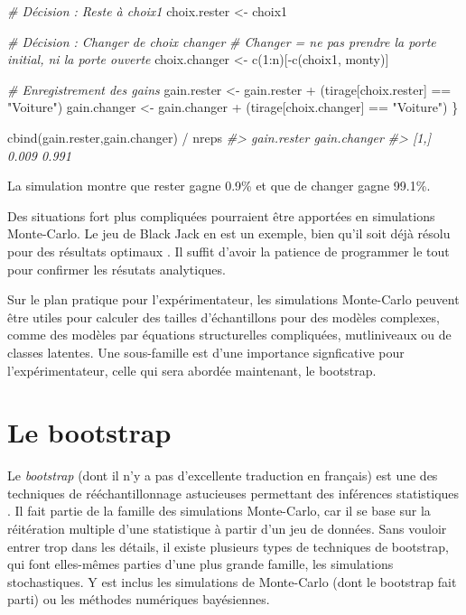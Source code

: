 \documentclass[
]{book}
\newenvironment{Shaded}{}{}
\newcommand{\CommentTok}[1]{\textit{#1}}
\newcommand{\DecValTok}[1]{#1}
\newcommand{\FunctionTok}[1]{#1}
\newcommand{\NormalTok}[1]{#1}
\newcommand{\OtherTok}[1]{#1}
\newcommand{\SpecialCharTok}[1]{#1}
\newcommand{\StringTok}[1]{#1}
\begin{document}
\begin{Shaded}
\begin{Highlighting}[]
  \CommentTok{\# Décision : Reste à choix1}
\NormalTok{  choix.rester }\OtherTok{\textless{}{-}}\NormalTok{ choix1}
  
  \CommentTok{\# Décision : Changer de choix changer}
  \CommentTok{\# Changer = ne pas prendre la porte initial, ni la porte ouverte}
\NormalTok{  choix.changer }\OtherTok{\textless{}{-}} \FunctionTok{c}\NormalTok{(}\DecValTok{1}\SpecialCharTok{:}\NormalTok{n)[}\SpecialCharTok{{-}}\FunctionTok{c}\NormalTok{(choix1, monty)]}
  
  \CommentTok{\# Enregistrement des gains}
\NormalTok{  gain.rester }\OtherTok{\textless{}{-}}\NormalTok{ gain.rester }\SpecialCharTok{+}\NormalTok{ (tirage[choix.rester] }\SpecialCharTok{==} \StringTok{"Voiture"}\NormalTok{)}
\NormalTok{  gain.changer }\OtherTok{\textless{}{-}}\NormalTok{ gain.changer }\SpecialCharTok{+}\NormalTok{ (tirage[choix.changer] }\SpecialCharTok{==} \StringTok{"Voiture"}\NormalTok{)}
\NormalTok{\}}

\FunctionTok{cbind}\NormalTok{(gain.rester,gain.changer)  }\SpecialCharTok{/}\NormalTok{ nreps}
\CommentTok{\#\textgreater{}      gain.rester gain.changer}
\CommentTok{\#\textgreater{} [1,]       0.009        0.991}
\end{Highlighting}
\end{Shaded}

La simulation montre que rester gagne 0.9\% et que de changer gagne 99.1\%.

Des situations fort plus compliquées pourraient être apportées en simulations Monte-Carlo. Le jeu de Black Jack en est un exemple, bien qu'il soit déjà résolu pour des résultats optimaux \autocite{Millman83}. Il suffit d'avoir la patience de programmer le tout pour confirmer les résutats analytiques.

Sur le plan pratique pour l'expérimentateur, les simulations Monte-Carlo peuvent être utiles pour calculer des tailles d'échantillons pour des modèles complexes, comme des modèles par équations structurelles compliquées, mutliniveaux ou de classes latentes. Une sous-famille est d'une importance signficative pour l'expérimentateur, celle qui sera abordée maintenant, le bootstrap.

\hypertarget{le-bootstrap}{%
\section{Le bootstrap}\label{le-bootstrap}}

Le \emph{bootstrap} (dont il n'y a pas d'excellente traduction en français) est une des techniques de rééchantillonnage astucieuses permettant des inférences statistiques \autocite{Efron79}. Il fait partie de la famille des simulations Monte-Carlo, car il se base sur la réitération multiple d'une statistique à partir d'un jeu de données. Sans vouloir entrer trop dans les détails, il existe plusieurs types de techniques de bootstrap, qui font elles-mêmes parties d'une plus grande famille, les simulations stochastiques. Y est inclus les simulations de Monte-Carlo (dont le bootstrap fait parti) ou les méthodes numériques bayésiennes.
\end{document}
